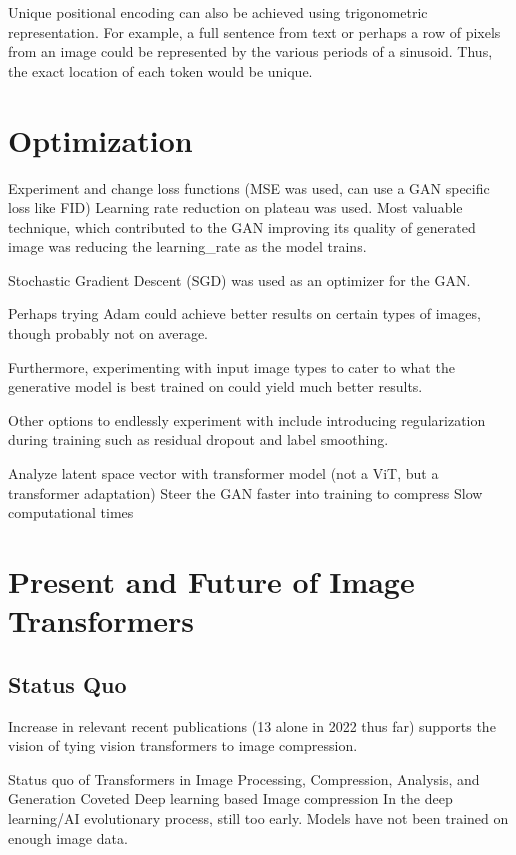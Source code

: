 Unique positional encoding can also be achieved using trigonometric representation.
For example, a full sentence from text or perhaps a row of pixels from an image could be represented by the various
periods of a sinusoid. Thus, the exact location of each token would be unique.

\section{Optimization} 

Experiment and change loss functions (MSE was used, can use a GAN specific loss like FID)
Learning rate reduction on plateau was used.
Most valuable technique, which contributed to the GAN improving its quality of generated image was
reducing the learning\_rate as the model trains.

Stochastic Gradient Descent (SGD) was used as an optimizer for the GAN.

Perhaps trying Adam could achieve better results on certain types of images, though probably
not on average.

Furthermore, experimenting with input image types to cater to what the generative model is best trained on
could yield much better results.

Other options to endlessly experiment with include introducing regularization during training such as residual dropout and label smoothing.

Analyze latent space vector with transformer model (not a ViT, but a transformer adaptation)
Steer the GAN faster into training to compress
Slow computational times



\section{Present and Future of Image Transformers}

\subsection{Status Quo}
Increase in relevant recent publications (13 alone in 2022 thus far) supports the vision of tying 
vision transformers to image compression.

Status quo of Transformers in Image Processing, Compression, Analysis, and Generation
Coveted Deep learning based Image compression 
In the deep learning/AI evolutionary process, still too early. Models have not been trained on enough image data.

